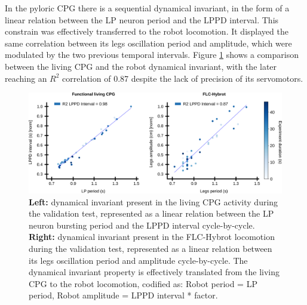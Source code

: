 In the pyloric CPG there is a sequential dynamical invariant, in the form of a linear relation between the LP neuron period and the LPPD interval. This constrain was effectively transferred to the robot locomotion. It displayed the same correlation between its legs oscillation period and amplitude, which were modulated by the two previous temporal intervals. Figure \ref{fig:robot_results_invariant} shows a comparison between the living CPG and the robot dynamical invariant, with the later reaching an $R^2$ correlation of 0.87 despite the lack of precision of its servomotors.

\begin{figure}[hbt!]
	\begin{center}
		\includegraphics[width=\linewidth]{./img/invariants/robot/robot_results_invariant}
	\end{center}
	\caption{\textbf{Left:} dynamical invariant present in the living CPG activity during the validation test, represented as a linear relation between the LP neuron bursting period and the LPPD interval cycle-by-cycle. \textbf{Right:} dynamical invariant present in the FLC-Hybrot locomotion during the validation test, represented as a linear relation between its legs oscillation period and amplitude cycle-by-cycle. The dynamical invariant property is effectively translated from the living CPG to the robot locomotion, codified as: Robot period = LP period, Robot amplitude = LPPD interval * factor.}
	\label{fig:robot_results_invariant}
\end{figure}
\newpage
\clearpage
